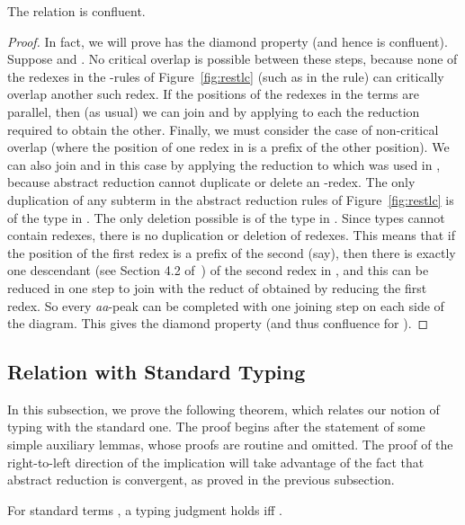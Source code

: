 \documentclass{LMCS}
\begin{document}
\begin{thm}
\label{lem:confl}
The relation  is confluent.
\end{thm}
\begin{proof}
In fact, we will prove  has the diamond property (and hence is
confluent).  Suppose  and .  No critical
overlap is possible between these steps, because none of the redexes
in the -rules of Figure~\ref{fig:restlc} (such as  in
the  rule) can critically overlap another such redex.  If
the positions of the redexes in the terms are parallel, then (as
usual) we can join  and  by applying to each the reduction
required to obtain the other.  Finally, we must consider the case of
non-critical overlap (where the position of one redex in  is a
prefix of the other position).  We can also join  and  in
this case by applying the reduction to  which was used in , because abstract reduction cannot duplicate or delete
an -redex.  The only duplication of any subterm in the abstract
reduction rules of Figure~\ref{fig:restlc} is of the type  in
.  The only deletion possible is of the type 
in .  Since types cannot contain redexes, there is
no duplication or deletion of redexes.  This means that if the
position of the first redex is a prefix of the second (say), then
there is exactly one descendant (see Section 4.2 of~\cite{terese}) of
the second redex in , and this can be reduced in one step to join
 with the reduct of  obtained by reducing the first redex.
So every \textit{aa}-peak can be completed with one joining step on
each side of the diagram.  This gives the diamond property (and thus
confluence for ).
\end{proof}

\subsection{Relation with Standard Typing}

In this subsection, we prove the following theorem, which relates our
notion of typing with the standard one.  The proof begins after the
statement of some simple auxiliary lemmas, whose proofs are routine
and omitted.  The proof of the right-to-left direction of the
implication will take advantage of the fact that abstract reduction is
convergent, as proved in the previous subsection.

\begin{thm}
\label{thm:relatetyp}
For standard terms , a typing judgment  holds iff .
\end{thm}
\end{document}
